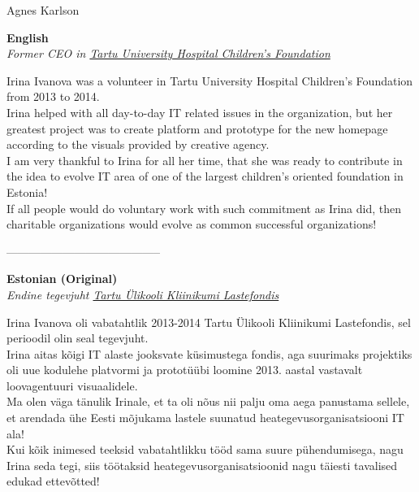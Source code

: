 \documentclass[a4paper, 12pt]{article}
\begin{document}
{

\begin{center}
\LARGE{Agnes Karlson}
\end{center}

\begin{center}
\textbf{English}\\
\textit{Former CEO in \href{https://www.lastefond.ee}{Tartu University Hospital Children's Foundation}}
\end{center}

Irina Ivanova was a volunteer in Tartu University Hospital Children's Foundation from 2013 to 2014.\\

Irina helped with all day-to-day IT related issues in the organization, but her greatest project was to create platform and prototype for the new homepage according to the visuals provided by creative agency.\\ 

I am very thankful to Irina for all her time, that she was ready to contribute in the idea to evolve IT area of one of the largest children's oriented foundation in Estonia!\\

If all people would do voluntary work with such commitment as Irina did, then charitable organizations would evolve as common successful organizations!\\

\begin{center}
\------------------------------------------
\end{center}

\begin{center}
\textbf{Estonian (Original)}\\
\textit{Endine tegevjuht \href{https://www.lastefond.ee}{Tartu Ülikooli Kliinikumi Lastefondis}}
\end{center}

Irina Ivanova oli vabatahtlik 2013-2014 Tartu Ülikooli Kliinikumi Lastefondis, sel perioodil olin seal tegevjuht.\\

Irina aitas kõigi IT alaste jooksvate küsimustega fondis, aga suurimaks projektiks oli uue kodulehe platvormi ja prototüübi loomine 2013. aastal vastavalt loovagentuuri visuaalidele.\\

Ma olen väga tänulik Irinale, et ta oli nõus nii palju oma aega panustama sellele, et arendada ühe Eesti mõjukama lastele suunatud heategevusorganisatsiooni IT ala!\\

Kui kõik inimesed teeksid vabatahtlikku tööd sama suure pühendumisega, nagu Irina seda tegi, siis töötaksid heategevusorganisatsioonid nagu täiesti tavalised edukad ettevõtted!\\

}
\end{document}
